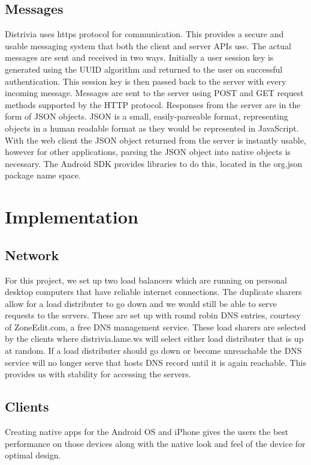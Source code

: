 \documentclass{dependencies/acm_proc_article-sp}
\begin{document}
\subsection{Messages}
Distrivia uses https protocol for communication. 
This provides a secure and usable messaging system that both the client and server APIs use.
The actual messages are sent and received in two ways. 
Initially a user session key is generated using the UUID\cite{uuid} algorithm and returned to the user on successful authentication. 
This session key is then passed back to the server with every incoming
message. 
Messages are sent to the server using POST and GET request methods supported
by the HTTP protocol. 
Responses from the server are in the form of JSON \cite{json} objects.
JSON is a small, easily-parseable format, representing objects in a human readable format as they would be represented in JavaScript. 
With the web client the JSON object returned from the server is instantly usable, however for other applications, parsing the JSON object into native objects is necessary. 
The Android SDK provides libraries to do this, located in the
org.json \cite{orgjson} package name space.

\section{Implementation}
\subsection{Network}


For this project, we set up two load balancers which are running on personal desktop computers that have reliable internet connections.
The duplicate sharers allow for a load distributer to go down and we would still be able to serve requests to the servers. 
These are set up with round robin DNS entries, courtesy of ZoneEdit.com, a free DNS management service.
These load sharers are selected by the clients where distrivia.lame.ws will select either load distributer that is up at random. 
If a load distributer should go down or become unreachable the DNS service will no longer serve that hosts DNS record until it is again reachable.
This provides us with stability for accessing the servers.

\subsection{Clients}
Creating native apps for the Android OS and iPhone gives the users the best performance on those devices along with the native look and feel of the device for optimal design.
\end{document}
